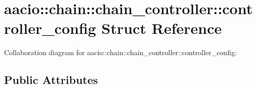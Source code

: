 \hypertarget{structaacio_1_1chain_1_1chain__controller_1_1controller__config}{}\section{aacio\+:\+:chain\+:\+:chain\+\_\+controller\+:\+:controller\+\_\+config Struct Reference}
\label{structaacio_1_1chain_1_1chain__controller_1_1controller__config}


Collaboration diagram for aacio\+:\+:chain\+:\+:chain\+\_\+controller\+:\+:controller\+\_\+config\+:
\subsection*{Public Attributes}
